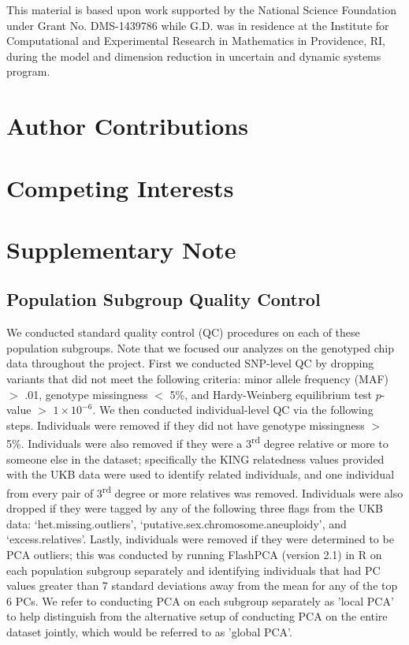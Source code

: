 \documentclass[12pt,a4paper]{article}
\begin{document}
This material is based upon work supported by the National Science Foundation under Grant No. DMS-1439786 while G.D. was in residence at the Institute for Computational and Experimental Research in Mathematics in Providence, RI, during the model and dimension reduction in uncertain and dynamic systems program.

\section{Author Contributions}\label{InterPath-Author-Contributions}

\section{Competing Interests}\label{InterPath-Competing-Interests}

\section{Supplementary Note}\label{Supplementary-Note}

\subsection{Population Subgroup Quality Control}

We conducted standard quality control (QC) procedures on each of these population subgroups. Note that we focused our analyzes on the genotyped chip data throughout the project. First we conducted SNP-level QC by dropping variants that did not meet the following criteria:  minor allele frequency (MAF) $>$ .01, genotype missingness $<$ 5\%, and Hardy-Weinberg equilibrium test $p$-value $>$ $1\times10^{-6}$. We then conducted individual-level QC via the following steps. Individuals were removed if they did not have genotype missingness $>$ 5\%. Individuals were also removed if they were a 3\textsuperscript{rd} degree relative or more to someone else in the dataset; specifically the KING relatedness values provided with the UKB data were used to identify related individuals, and one individual from every pair of 3\textsuperscript{rd} degree or more relatives was removed. Individuals were also dropped if they were tagged by any of the following three flags from the UKB data: `het.missing.outliers', `putative.sex.chromosome.aneuploidy', and `excess.relatives'. Lastly, individuals were removed if they were determined to be PCA outliers; this was conducted by running FlashPCA (version 2.1) \citep{Abraham2017} in R on each population subgroup separately and identifying individuals that had PC values greater than 7 standard deviations away from the mean for any of the top 6 PCs. We refer to conducting PCA on each subgroup separately as 'local PCA' to help distinguish from the alternative setup of conducting PCA on the entire dataset jointly, which would be referred to as 'global PCA'. 
\end{document}
